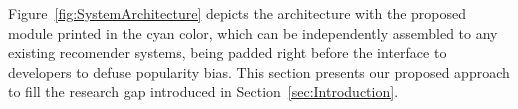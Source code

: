 












Figure~\ref{fig:SystemArchitecture} depicts the architecture with the proposed module printed in the cyan color, which can be independently assembled to any existing recomender systems, %
being padded right before the interface to developers to defuse popularity bias.
This section presents our proposed approach to fill the research gap introduced in Section~\ref{sec:Introduction}. %






